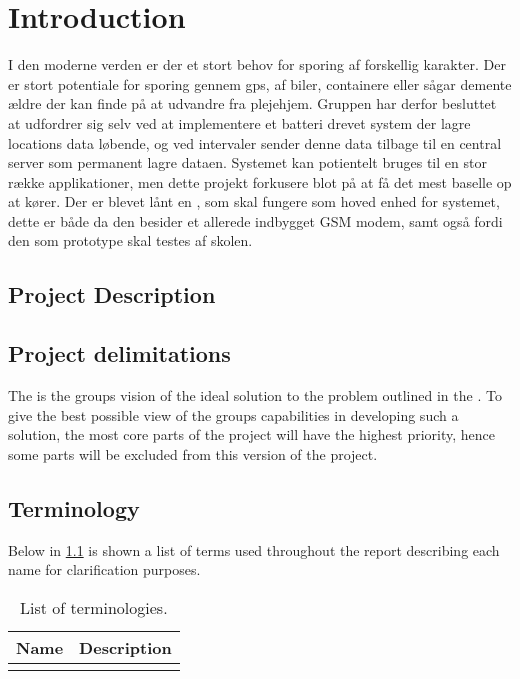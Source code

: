 
\chapter{Introduction}
\label{sec:introduction}
I den moderne verden er der et stort behov for sporing af forskellig karakter. Der er stort potentiale for sporing gennem gps, af biler, containere eller sågar demente ældre der kan finde på at udvandre fra plejehjem. 
Gruppen har derfor besluttet at udfordrer sig selv ved at implementere et batteri drevet system der lagre locations data løbende, og ved intervaler sender denne data tilbage til en central server som permanent lagre dataen. Systemet kan potientelt bruges til en stor række applikationer, men dette projekt forkusere blot på at få det mest baselle op at kører.
Der er blevet lånt en \MKR, som skal fungere som hoved enhed for systemet, dette er både da den besider et allerede indbygget GSM modem, samt også fordi den som prototype skal testes af skolen.

\section{Project Description}
\label{sec:projectDescription}


\section{Project delimitations}
\label{sec:delimitations}
The  is the groups vision of the ideal solution to the problem outlined in the .  
To give the best possible view of the groups capabilities in developing such a solution, the most core parts of the project will have the highest priority, hence some parts will be excluded from this version of the project. 

\section{Terminology}
\label{sec:terminology}
Below in \cref{tab:terminology} is shown a list of terms used throughout the report describing each name for clarification purposes.

\begin{table}[H]
	\centering
	\begin{tabularx}{0.8\textwidth}{l X}
		\toprule
		\textbf{Name} & \textbf{Description} \\
		\midrule
		&\\
		\bottomrule
	\end{tabularx}
	\caption{List of terminologies.}
	\label{tab:terminology}
\end{table}